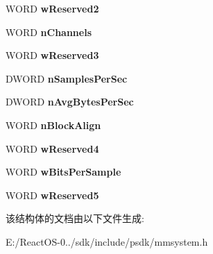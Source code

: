 \begin{DoxyCompactItemize}
W\+O\+RD {\bfseries w\+Reserved2}
\item 
\mbox{\label{structtag_m_c_i___w_a_v_e___s_e_t___p_a_r_m_s_a2baee834b1081fdf7773fe55dd29487d}} 
W\+O\+RD {\bfseries n\+Channels}
\item 
\mbox{\label{structtag_m_c_i___w_a_v_e___s_e_t___p_a_r_m_s_ad8aa586cd1888d05f534339db5eb093b}} 
W\+O\+RD {\bfseries w\+Reserved3}
\item 
\mbox{\label{structtag_m_c_i___w_a_v_e___s_e_t___p_a_r_m_s_a7e0b2513b80b8c8e1fe598b5f16fa481}} 
D\+W\+O\+RD {\bfseries n\+Samples\+Per\+Sec}
\item 
\mbox{\label{structtag_m_c_i___w_a_v_e___s_e_t___p_a_r_m_s_a6161492edb3c59c46d0047182c964b3b}} 
D\+W\+O\+RD {\bfseries n\+Avg\+Bytes\+Per\+Sec}
\item 
\mbox{\label{structtag_m_c_i___w_a_v_e___s_e_t___p_a_r_m_s_ab43630dc841c43bdab3a35e86ff65d23}} 
W\+O\+RD {\bfseries n\+Block\+Align}
\item 
\mbox{\label{structtag_m_c_i___w_a_v_e___s_e_t___p_a_r_m_s_a2487f3a125d26a9e57fc90d1d745c77f}} 
W\+O\+RD {\bfseries w\+Reserved4}
\item 
\mbox{\label{structtag_m_c_i___w_a_v_e___s_e_t___p_a_r_m_s_a1b1cb8452323089b385db8eccbe97259}} 
W\+O\+RD {\bfseries w\+Bits\+Per\+Sample}
\item 
\mbox{\label{structtag_m_c_i___w_a_v_e___s_e_t___p_a_r_m_s_a8c4ea5ecf8fecf6d62e708bcb5503e3f}} 
W\+O\+RD {\bfseries w\+Reserved5}
\end{DoxyCompactItemize}


该结构体的文档由以下文件生成\+:\begin{DoxyCompactItemize}
\item 
E\+:/\+React\+O\+S-\/0../sdk/include/psdk/mmsystem.\+h\end{DoxyCompactItemize}
